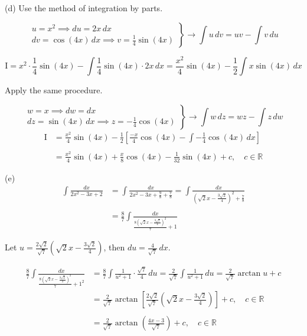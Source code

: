 \documentclass{article}
\begin{document}
\noindent (d) Use the method of integration by parts.

\[
\left.\begin{array}{c}
u=x^2\implies du=2x\,dx\\[1em]
\displaystyle dv=\cos(4x)\,dx\implies v=\frac14\sin(4x)
\end{array}\right\}\rightarrow\int u\,dv=uv-\int v\,du
\]

\[\mathrm{I}=x^2\cdot\frac14\sin(4x)-\int\frac14\sin(4x)\cdot2x\,dx=\frac{x^2}4\sin(4x)-\frac12\int x\sin(4x)\,dx\]

\hfill

\noindent Apply the same procedure.

\[
\left.\begin{array}{c}
w=x\implies dw=dx\\[1em]
\displaystyle dz=\sin(4x)\,dx\implies z=-\frac14\cos(4x)
\end{array}\right\}\rightarrow\int w\,dz=wz-\int z\,dw
\]
\begin{align*}\mathrm{I}&=\frac{x^2}4\sin(4x)-\frac12\left[\frac{-x}4\cos(4x)-\int-\frac14\cos(4x)\,dx\right]\\\\&=\boxed{\frac{x^2}4\sin(4x)+\frac x8\cos(4x)-\frac1{32}\sin(4x)+c,\quad c\in\mathbb{R}}\end{align*}

\hfill

\noindent (e)
\begin{align*}\int\frac{dx}{2x^2-3x+2}&=\int\frac{dx}{\displaystyle2x^2-3x+\frac98+\frac78}=\int\frac{dx}{\displaystyle\left(\sqrt2x-\frac{3\sqrt2}4\right)^2+\frac78}\\\\&=\frac87\int\frac{dx}{\displaystyle\frac{8\left(\sqrt2x-\frac{3\sqrt2}4\right)^2}7+1}\end{align*}

\hfill

\noindent Let $\displaystyle u=\frac{2\sqrt2}{\sqrt7}\left(\sqrt2x-\frac{3\sqrt2}4\right)$, then $\displaystyle du=\frac4{\sqrt7}\,dx$.

\begin{align*}\frac87\int\frac{dx}{\displaystyle\frac{8\left(\sqrt2x-\frac{3\sqrt2}4\right)^2}7+1^2}&=\frac87\int\frac{1}{u^2+1}\cdot\frac{\sqrt7}4\,du=\frac2{\sqrt7}\int\frac1{u^2+1}\,du=\frac2{\sqrt7}\arctan u+c\\&=\frac2{\sqrt7}\arctan\left[\frac{2\sqrt2}{\sqrt7}\left(\sqrt2x-\frac{3\sqrt2}4\right)\right]+c,\quad c\in\mathbb{R}\\\\&=\boxed{\frac2{\sqrt7}\arctan\left(\frac{4x-3}{\sqrt7}\right)+c,\quad c\in\mathbb{R}}\end{align*}
\end{document}
